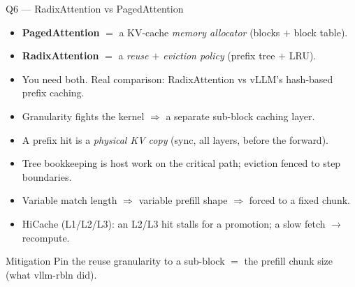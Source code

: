 \begin{frame}{Q6 — RadixAttention vs PagedAttention}
  \begin{itemize}
    \item \textbf{PagedAttention} $=$ a KV-cache \emph{memory allocator} (blocks $+$ block table).
    \item \textbf{RadixAttention} $=$ a \emph{reuse $+$ eviction policy} (prefix tree $+$ LRU).
    \item You need both. Real comparison: RadixAttention vs vLLM's hash-based prefix caching.
  \end{itemize}
  \begin{itemize}
    \item Granularity fights the kernel $\Rightarrow$ a separate sub-block caching layer.
    \item A prefix hit is a \emph{physical KV copy} (sync, all layers, before the forward).
    \item Tree bookkeeping is host work on the critical path; eviction fenced to step boundaries.
    \item Variable match length $\Rightarrow$ variable prefill shape $\Rightarrow$ forced to a fixed chunk.
    \item HiCache (L1/L2/L3): an L2/L3 hit stalls for a promotion; a slow fetch $\to$ recompute.
  \end{itemize}
  \begin{alertblock}{Mitigation}
    Pin the reuse granularity to a sub-block $=$ the prefill chunk size (what vllm-rbln did).
  \end{alertblock}
\end{frame}
